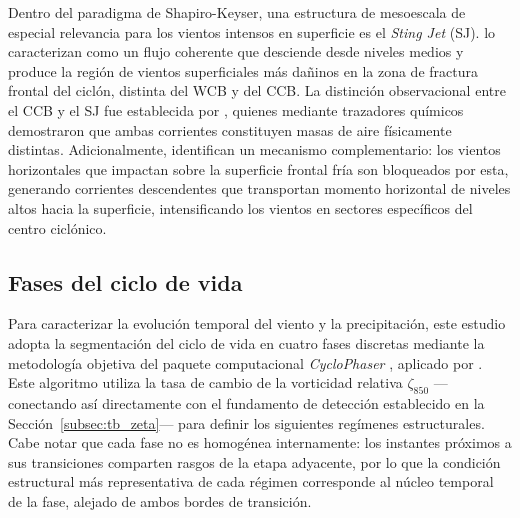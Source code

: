 Dentro del paradigma de Shapiro-Keyser, una estructura de mesoescala de especial relevancia para los vientos intensos en superficie es el \textit{Sting Jet} (SJ). \citet{clark2005sting} lo caracterizan como un flujo coherente que desciende desde niveles medios y produce la región de vientos superficiales más dañinos en la zona de fractura frontal del ciclón, distinta del WCB y del CCB. La distinción observacional entre el CCB y el SJ fue establecida por \citet{martinez2014cold}, quienes mediante trazadores químicos demostraron que ambas corrientes constituyen masas de aire físicamente distintas. Adicionalmente, \citet{hyeok2024extrem} identifican un mecanismo complementario: los vientos horizontales que impactan sobre la superficie frontal fría son bloqueados por esta, generando corrientes descendentes que transportan momento horizontal de niveles altos hacia la superficie, intensificando los vientos en sectores específicos del centro ciclónico.

\subsection{Fases del ciclo de vida}\label{subsec:tb_fases}

Para caracterizar la evolución temporal del viento y la precipitación, este estudio adopta la segmentación del ciclo de vida en cuatro fases discretas mediante la metodología objetiva del paquete computacional \textit{CycloPhaser} \citep{deSouza2025CycloPhaser}, aplicado por \citet{coutodesouza2024new}. Este algoritmo utiliza la tasa de cambio de la vorticidad relativa $\zeta_{850}$ —conectando así directamente con el fundamento de detección establecido en la Sección~\ref{subsec:tb_zeta}— para definir los siguientes regímenes estructurales. Cabe notar que cada fase no es homogénea internamente: los instantes próximos a sus transiciones comparten rasgos de la etapa adyacente, por lo que la condición estructural más representativa de cada régimen corresponde al núcleo temporal de la fase, alejado de ambos bordes de transición.

